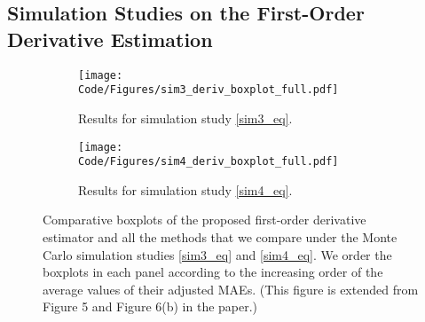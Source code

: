 \documentclass{uwstat572}
\theoremstyle{definition}
\theoremstyle{theorem}
\begin{document}
\subsection{Simulation Studies on the First-Order Derivative Estimation}
\label{Sec:sim_first_order}

\begin{figure}
	\captionsetup[subfigure]{justification=centering}
	\begin{subfigure}[t]{0.49\linewidth}
		\centering
		\texttt{[image: Code/Figures/sim3\_deriv\_boxplot\_full.pdf]}
		\caption{Results for simulation study \eqref{sim3_eq}.}
	\end{subfigure}
	\hfil
	\begin{subfigure}[t]{0.49\linewidth}
		\centering
		\texttt{[image: Code/Figures/sim4\_deriv\_boxplot\_full.pdf]}
		\caption{Results for simulation study \eqref{sim4_eq}.}
	\end{subfigure}
	\caption{Comparative boxplots of the proposed first-order derivative estimator and all the methods that we compare under the Monte Carlo simulation studies \eqref{sim3_eq} and \eqref{sim4_eq}. We order the boxplots in each panel according to the increasing order of the average values of their adjusted MAEs. (This figure is extended from Figure 5 and Figure 6(b) in the paper.)}
	\label{fig:sim_first_boxplot}
\end{figure}
\end{document}
